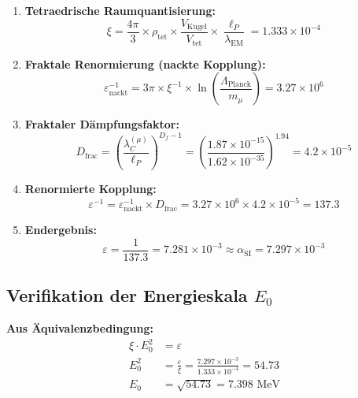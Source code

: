 \documentclass[12pt,a4paper]{article}
\numberwithin{equation}{section}
\newcommand{\xipar}{\xi}
\newcommand{\epsilonT}{\varepsilon}
\newcommand{\alphaSI}{\alpha_{\text{SI}}}
\newcommand{\Df}{D_f}
\newcommand{\Eo}{E_0}
\newcommand{\lP}{\ell_P}
\newcommand{\lambdaC}{\lambda_C}
\newcommand{\lambdaEM}{\lambda_{\text{EM}}}
\begin{document}
	\begin{enumerate}
		\item \textbf{Tetraedrische Raumquantisierung:}
		\begin{equation}
			\xipar = \frac{4\pi}{3} \times \rho_{\text{tet}} \times \frac{V_{\text{Kugel}}}{V_{\text{tet}}} \times \frac{\lP}{\lambdaEM} = 1.333 \times 10^{-4}
			\label{eq:xi_step1}
		\end{equation}
		
		\item \textbf{Fraktale Renormierung (nackte Kopplung):}
		\begin{equation}
			\epsilonT^{-1}_{\text{nackt}} = 3\pi \times \xipar^{-1} \times \ln\left(\frac{\Lambda_{\text{Planck}}}{m_\mu}\right) = 3.27 \times 10^6
			\label{eq:epsilon_step2}
		\end{equation}
		
		\item \textbf{Fraktaler Dämpfungsfaktor:}
		\begin{equation}
			D_{\text{frac}} = \left(\frac{\lambdaC^{(\mu)}}{\lP}\right)^{\Df-1} = \left(\frac{1.87 \times 10^{-15}}{1.62 \times 10^{-35}}\right)^{1.94} = 4.2 \times 10^{-5}
			\label{eq:epsilon_step3}
		\end{equation}
		
		\item \textbf{Renormierte Kopplung:}
		\begin{equation}
			\epsilonT^{-1} = \epsilonT^{-1}_{\text{nackt}} \times D_{\text{frac}} = 3.27 \times 10^6 \times 4.2 \times 10^{-5} = 137.3
			\label{eq:epsilon_step4}
		\end{equation}
		
		\item \textbf{Endergebnis:}
		\begin{equation}
			\epsilonT = \frac{1}{137.3} = 7.281 \times 10^{-3} \approx \alphaSI = 7.297 \times 10^{-3}
			\label{eq:epsilon_step5}
		\end{equation}
	\end{enumerate}
	
	\subsection{Verifikation der Energieskala $\Eo$}
	
	\textbf{Aus Äquivalenzbedingung:}
	\begin{align}
		\xipar \cdot \Eo^2 &= \epsilonT\\
		\Eo^2 &= \frac{\epsilonT}{\xipar} = \frac{7.297 \times 10^{-3}}{1.333 \times 10^{-4}} = 54.73\\
		\Eo &= \sqrt{54.73} = 7.398 \text{ MeV}
		\label{eq:e0_verification}
	\end{align}
	
\end{document}
